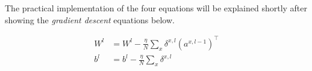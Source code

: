\documentclass{article}
\begin{document}
The practical implementation of the four equations will be explained shortly
after showing the \textit{gradient descent} equations below.

\begin{align}
	W^{l} & = W^{l} - \frac{\eta}{N} \sum_{x}{\delta^{x, l}(a^{x, l-1})^\top} \\
	b^{l} & = b^{l} - \frac{\eta}{N} \sum_{x}{\delta^{x, l}}
\end{align}



\pagebreak
\printbibliography
\end{document}
